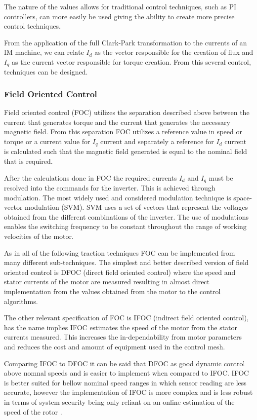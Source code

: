 The nature of the values allows for traditional control techniques, such as PI controllers, can more easily be used giving the ability to create more precise control techniques.

From the application of the full Clark-Park transformation to the currents of an IM machine, we can relate $I_d$ as the vector responsible for the creation of flux and $I_q$ as the current vector responsible for torque creation. From this several control, techniques can be designed.

\subsubsection{Field Oriented Control}
Field oriented control (FOC) utilizes the separation described above between the current that generates torque and the current that generates the necessary magnetic field. From this separation FOC utilizes a reference value in speed or torque or a current value for $I_q$ current and separately a reference for $I_d$ current is calculated such that the magnetic field generated is equal to the nominal field that is required.

After the calculations done in FOC the required currents $I_d$ and $I_q$ must be resolved into the commands for the inverter. This is achieved through modulation. The most widely used and considered modulation technique is space-vector modulation (SVM). SVM uses a set of vectors that represent the voltages obtained from the different combinations of the inverter. The use of modulations enables the switching frequency to be constant throughout the range of working velocities of the motor.

As in all of the following traction techniques FOC can be implemented from many different sub-techniques. The simplest and better described version of field oriented control is DFOC (direct field oriented control) where the speed and stator currents of the motor are measured resulting in almost direct implementation from the values obtained from the motor to the control algorithms. 

The other relevant specification of FOC is IFOC (indirect field oriented control), has the name implies IFOC estimates the speed of the motor from the stator currents measured. This increases the in-dependability from motor parameters and reduces the cost and amount of equipment used in the control mesh.

Comparing IFOC to DFOC it can be said that DFOC as good dynamic control above nomnal speeds and is easier to implement when compared to IFOC. IFOC is better suited for bellow nominal speed ranges in which sensor reading are less accurate, however the implementation of IFOC is more complex and is less robust in terms of system security being only reliant on an online estimation of the speed of the rotor \cite{DFOC-IFOC}. 

